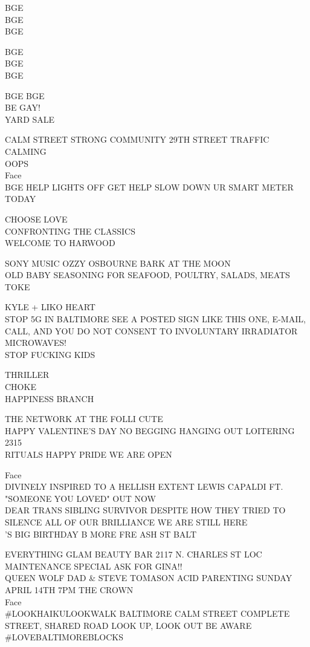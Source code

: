 \documentclass[10pt,letterpaper]{article}
\begin{document}
BGE\\
BGE\\
BGE

BGE\\
BGE\\
BGE

BGE BGE\\
BE GAY!\\
YARD SALE

CALM STREET STRONG COMMUNITY 29TH STREET TRAFFIC CALMING\\
OOPS\\
Face\\
BGE HELP LIGHTS OFF GET HELP SLOW DOWN UR SMART METER TODAY

CHOOSE LOVE\\
CONFRONTING THE CLASSICS\\
WELCOME TO HARWOOD

SONY MUSIC OZZY OSBOURNE BARK AT THE MOON\\
OLD BABY SEASONING FOR SEAFOOD, POULTRY, SALADS, MEATS\\
TOKE

KYLE + LIKO HEART\\
STOP 5G IN BALTIMORE SEE A POSTED SIGN LIKE THIS ONE, E{-}MAIL, CALL, AND YOU DO NOT CONSENT TO INVOLUNTARY IRRADIATOR MICROWAVES!\\
STOP FUCKING KIDS

THRILLER\\
CHOKE\\
HAPPINESS BRANCH

THE NETWORK AT THE FOLLI CUTE\\
HAPPY VALENTINE'S DAY NO BEGGING HANGING OUT LOITERING\\
2315\\
RITUALS HAPPY PRIDE WE ARE OPEN

Face\\
DIVINELY INSPIRED TO A HELLISH EXTENT LEWIS CAPALDI FT. "SOMEONE YOU LOVED" OUT NOW\\
DEAR TRANS SIBLING SURVIVOR DESPITE HOW THEY TRIED TO SILENCE ALL OF OUR BRILLIANCE WE ARE STILL HERE\\
'S BIG BIRTHDAY B MORE FRE ASH ST BALT

EVERYTHING GLAM BEAUTY BAR 2117 N. CHARLES ST LOC MAINTENANCE SPECIAL ASK FOR GINA!!\\
QUEEN WOLF DAD \& STEVE TOMASON ACID PARENTING SUNDAY APRIL 14TH 7PM THE CROWN\\
Face\\
\#LOOKHAIKULOOKWALK BALTIMORE CALM STREET COMPLETE STREET, SHARED ROAD LOOK UP, LOOK OUT BE AWARE \#LOVEBALTIMOREBLOCKS
\end{document}
